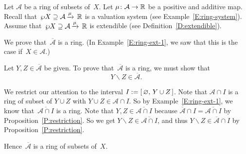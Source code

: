 %
%
\begin{ex}
\label{E:ring-ext-2}
Let $\mathcal{A}$
be a ring of subsets of~$X$.
Let $\mu\colon \mathcal A \rightarrow \mathbb{R}$
be a positive and additive map.
Recall that~$\wp X \supseteq \mathcal{A}\,\smash{\xrightarrow{\mu}\,\mathbb{R}}$
is a valuation system (see Example~\ref{E:ring-system}).
Assume that~$\wp X \supseteq \mathcal{A}\,\smash{\xrightarrow{\mu}\,\mathbb{R}}$
is extendible
(see Definition~\ref{D:extendible}).

We prove that~$\overline{\mathcal{A}}$ is a ring.
(In Example~\ref{E:ring-ext-1},
we saw that this
is the case if~$X\in \mathcal{A}$.)

Let $Y,Z\in\overline{\mathcal{A}}$ be given.
To prove that~$\overline{\mathcal{A}}$
is a ring,
we must show that
\begin{equation*}
Y\backslash Z\in\overline{\mathcal{A}}.
\end{equation*}

We restrict our attention to the interval $I:= [\,\varnothing,\, Y\cup Z\,]$.
Note that $\mathcal{A}\cap I$ is a ring of subset of $Y\cup Z$
with $Y\cup Z\in\mathcal{A}\cap I$.
So by Example~\ref{E:ring-ext-1},
we know that~$\overline{\mathcal{A}\cap I}$ is a ring.
Note that 
$Y,Z\in\overline{\mathcal{A}\cap I}$
because $\overline{\mathcal A} \cap I 
= \overline{ \mathcal A \cap I}$
by Proposition~\ref{P:restriction}.
So we get $Y\backslash Z\in \overline{\mathcal{A}\cap I}$,
and thus $Y\backslash Z\in \overline{\mathcal{A}}\cap I$
by Proposition~\ref{P:restriction}.

Hence~$\overline{\mathcal{A}}$ is a ring of subsets of~$X$.
\end{ex}

